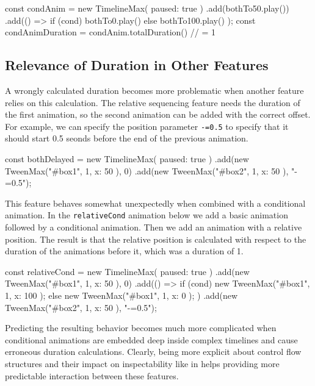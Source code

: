 \begin{js}
const condAnim = new TimelineMax({ paused: true })
  .add(bothTo50.play())
  .add(() => { if (cond) { bothTo0.play()   }
               else      { bothTo100.play() } });
const condAnimDuration = condAnim.totalDuration() // = 1
\end{js}

\subsection{Relevance of Duration in Other Features}

A wrongly calculated duration becomes more problematic when another feature relies on this calculation. The relative sequencing feature needs the duration of the first animation, so the second animation can be added with the correct offset. For example, we can specify the position parameter \texttt{-=0.5} to specify that it should start 0.5 seonds before the end of the previous animation.

\begin{js}
const bothDelayed = new TimelineMax({ paused: true })
  .add(new TweenMax("#box1", 1, { x: 50 }), 0)
  .add(new TweenMax("#box2", 1, { x: 50 }), "-=0.5");
\end{js}

This feature behaves somewhat unexpectedly when combined with a
conditional animation. In the \texttt{relativeCond} animation below we add a
basic animation followed by a conditional animation. Then we add an animation
with a relative position. The result is that the relative position is
calculated with respect to the duration of the animations before it, which was
a duration of 1.

\begin{js}
const relativeCond = new TimelineMax({ paused: true })
  .add(new TweenMax("#box1", 1, { x: 50 }), 0)
  .add(() => { if (cond) { new TweenMax("#box1", 1, { x: 100 });
               } else { new TweenMax("#box1", 1, { x: 0 }); } })
  .add(new TweenMax("#box2", 1, { x: 50 }), "-=0.5");
\end{js}

Predicting the resulting behavior becomes much more complicated when
conditional animations are embedded deep inside complex timelines and cause
erroneous duration calculations.  Clearly, being more explicit about control
flow structures and their impact on inspectability like in \dsl{} helps
providing more predictable interaction between these features.

